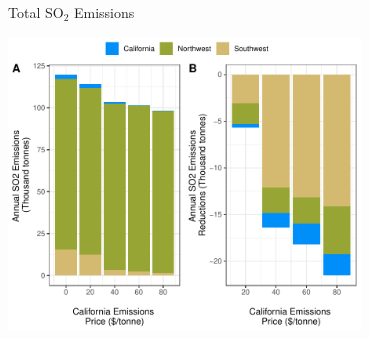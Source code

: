 \documentclass[11pt, aspectratio = 169]{beamer}
\newcommand{\1}{\mathds{1}}
\begin{document}
\begin{frame}{Total SO$_2$ Emissions}

    \centering
    \includegraphics[width = 0.7\textwidth]{figures/chapter5_figures/sim_so2_bca.pdf}
        
\end{frame}
\end{document}
